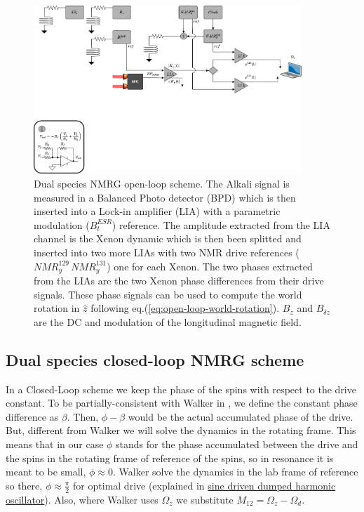 \documentclass{article}
\begin{document}
\begin{figure}[h]
\centering
\includegraphics[width=0.9\textwidth]{Theory/Figures/NMRG_open_loop_scheme.png}
\caption{Dual species NMRG open-loop scheme. The Alkali signal is measured in a Balanced Photo detector (BPD) which is then inserted into a Lock-in amplifier (LIA) with a parametric modulation ($B^{ESR}_t$) reference. The amplitude extracted from the LIA channel is the Xenon dynamic which is then been splitted and inserted into two more LIAs with two NMR drive references ($NMR^{129}_y\,NMR^{131}_y$) one for each Xenon. The two phases extracted from the LIAs are the two Xenon phase differences from their drive signals. These phase signals can be used to compute the world rotation in $\hat{z}$ following eq.(\ref{eq:open-loop-world-rotation}). $B_z$ and $B_{\delta z}$ are the DC and modulation of the longitudinal magnetic field.}
\label{fig:open_loop_scheme}
\end{figure}


\subsection{Dual species closed-loop NMRG scheme}
In a Closed-Loop scheme we keep the phase of the spins with respect to the drive constant. To be partially-consistent with Walker in \cite{walker2016spin}, we define the constant phase difference as $\beta$. Then, $\phi-\beta$ would be the actual accumulated phase of the drive. But, different from Walker we will solve the dynamics in the rotating frame. This means that in our case $\phi$ stands for the phase accumulated between the drive and the spins in the rotating frame of reference of the spins, so in resonance it is meant to be small, $\phi\approx 0$. Walker solve the dynamics in the lab frame of reference so there, $\phi\approx \frac{\pi}{2}$ for optimal drive (explained in \href{https://en.wikipedia.org/wiki/Harmonic_oscillator#Sinusoidal_driving_force}{sine driven dumped harmonic oscillator}). Also, where Walker uses $\Omega_z$ we substitute $M_{12}=\Omega_z-\Omega_d$. 
\end{document}
